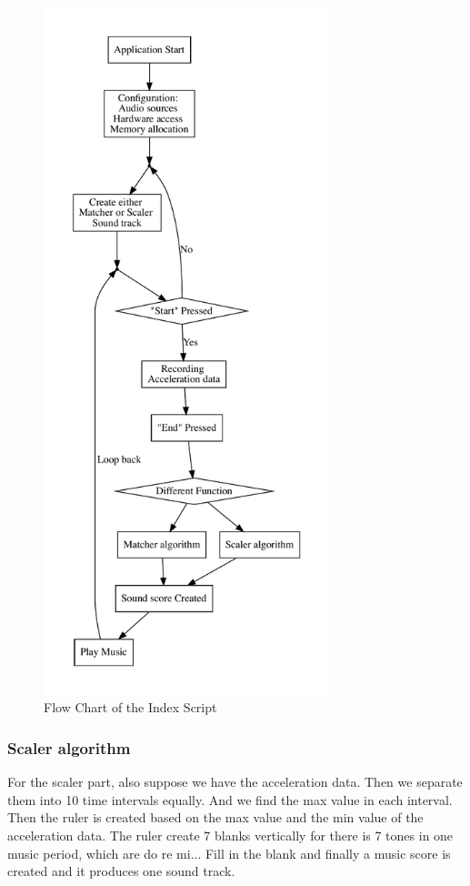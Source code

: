 \begin{figure}[htbp]
\centering
\includegraphics[height=20cm]{figWR/a}
\caption{Flow Chart of the Index Script}
\label{indexScript}
\end{figure}

\subsubsection{Scaler algorithm}

   For the scaler part, also suppose we have the acceleration data.
   Then we separate them into 10 time intervals equally.
   And we find the max value in each interval.
   Then the ruler is created based on the max value and the min value of the
   acceleration data.
   The ruler create 7 blanks vertically for there is 7 tones in one music
   period, which are do re mi...
   Fill in the blank and finally a music score is created and it produces one
   sound track.

